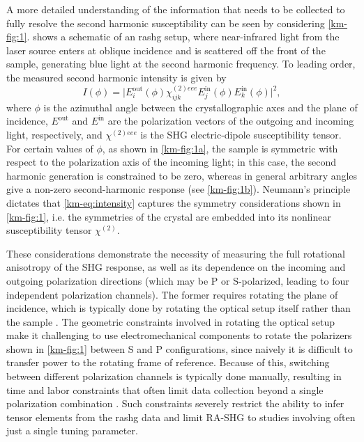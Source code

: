 A more detailed understanding of the information that needs to be collected to fully resolve the second harmonic susceptibility can be seen by considering \cref{km-fig:1}.
 shows a schematic of an \gls{rashg} setup, where near-infrared light from the laser source enters at oblique incidence and is scattered off the front of the sample, generating blue light at the second harmonic frequency.
To leading order, the measured second harmonic intensity is given by
\begin{equation}
I(\phi) = \big| E^{\mathrm{out}}_i(\phi) \chi^{(2)eee}_{ijk} E^{\mathrm{in}}_j(\phi) E^{\mathrm{in}}_k(\phi)\big|^2,
    \label{km-eq:intensity}
\end{equation}
where $\phi$ is the azimuthal angle between the crystallographic axes and the plane of incidence, $E^{\mathrm{out}}$ and $E^{\mathrm{in}}$ are the polarization vectors of the outgoing and incoming light, respectively, and $\chi^{(2)eee}$ is the SHG electric-dipole susceptibility tensor.
For certain values of $\phi$, as shown in \cref{km-fig:1a}, the sample is symmetric with respect to the polarization axis of the incoming light; in this case, the second harmonic generation is constrained to be zero, whereas in general arbitrary angles give a non-zero second-harmonic response (see \cref{km-fig:1b}).
Neumann's principle dictates that \cref{km-eq:intensity} captures the symmetry considerations shown in \cref{km-fig:1}, i.e. the symmetries of the crystal are embedded into its nonlinear susceptibility tensor $\chi^{(2)}$.

These considerations demonstrate the necessity of measuring the full rotational anisotropy of the SHG response, as well as its dependence on the incoming and outgoing polarization directions (which may be P or S-polarized, leading to four independent polarization channels).
The former requires rotating the plane of incidence, which is typically done by rotating the optical setup itself rather than the sample \citep{petersen_nonlinear_2006,torchinsky_low_2014, fichera_second_2020, camn2bi2}. 
The geometric constraints involved in rotating the optical setup make it challenging to use electromechanical components to rotate the polarizers shown in \cref{km-fig:1} between S and P configurations, since naively it is difficult to transfer power to the rotating frame of reference.
Because of this, switching between different polarization channels is typically done manually, resulting in time and labor constraints that often limit data collection beyond a single polarization combination \citep{shan_giant_2021}.
Such constraints severely restrict the ability to infer tensor elements from the \gls{rashg} data and limit RA-SHG to studies involving often just a single tuning parameter. 


